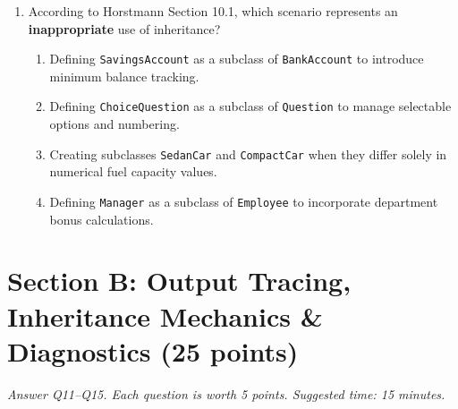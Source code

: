\documentclass[11pt,a4paper]{article}
\begin{document}
\begin{enumerate}[label=\textbf{Q\arabic*.},leftmargin=2em,itemsep=1.5pt,topsep=1pt,resume]
\begin{enumerate}[label=\Alph*.,leftmargin=2em]
\item Define the method with body: \lstinline|raise NotImplementedError("Subclasses must override this method")|.
\item Prepend the method header with the mandatory keyword: \texttt{abstract def method(self):}.
\item Enclose the method name in quadruple underscores: \texttt{def \_\_\_\_process\_\_\_\_(self):}.
\item Omit the method entirely from the superclass so Python auto-generates it at runtime.
\end{enumerate}
\item According to Horstmann Section 10.1, which scenario represents an \textbf{inappropriate} use of inheritance?
\begin{enumerate}[label=\Alph*.,leftmargin=2em]
\item Defining \texttt{SavingsAccount} as a subclass of \texttt{BankAccount} to introduce minimum balance tracking.
\item Defining \texttt{ChoiceQuestion} as a subclass of \texttt{Question} to manage selectable options and numbering.
\item Creating subclasses \texttt{SedanCar} and \texttt{CompactCar} when they differ solely in numerical fuel capacity values.
\item Defining \texttt{Manager} as a subclass of \texttt{Employee} to incorporate department bonus calculations.
\end{enumerate}
\end{enumerate}
\vspace{-1mm}
\section*{Section B: Output Tracing, Inheritance Mechanics \& Diagnostics \hfill \normalsize\normalfont(25 points)}
\textit{Answer Q11--Q15. Each question is worth 5 points. Suggested time: 15 minutes.}
\end{document}
